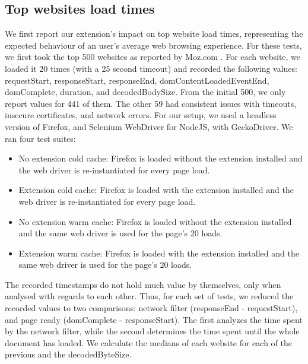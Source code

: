 \subsection{Top websites load times}
We first report our extension's impact on top website load times, representing the expected behaviour of an user's average web browsing experience. For these tests, we first took the top 500 websites as reported by Moz.com \cite{top500}. For each website, we loaded it 20 times (with a 25 second timeout) and recorded the following values: requestStart, responseStart, responseEnd, domContentLoadedEventEnd, domComplete, duration, and decodedBodySize. From the initial 500, we only report values for 441 of them. The other 59 had consistent issues with timeouts, insecure certificates, and network errors. For our setup, we used a headless version of Firefox, and Selenium WebDriver for NodeJS, with GeckoDriver. We ran four test suites:
\begin{itemize}
	\item No extension cold cache: Firefox is loaded without the extension installed and the web driver is re-instantiated for every page load.
	\item Extension cold cache: Firefox is loaded with the extension installed and the web driver is re-instantiated for every page load.
	\item No extension warm cache: Firefox is loaded without the extension installed and the same web driver is used for the page's 20 loads.
	\item Extension warm cache: Firefox is loaded with the extension installed and the same web driver is used for the page's 20 loads.
\end{itemize}

The recorded timestamps do not hold much value by themselves, only when analysed with regards to each other. Thus, for each set of tests, we reduced the recorded values to two comparisons: network filter (responseEnd - requestStart), and page ready (domComplete - responseStart). The first analyzes the time spent by the network filter, while the second determines the time spent until the whole document has loaded. We calculate the medians of each website for each of the previous and the decodedByteSize.

